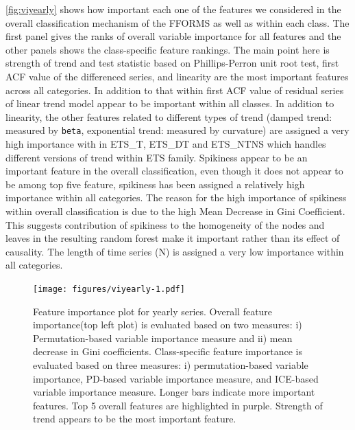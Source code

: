 \documentclass[11pt,a4paper,]{article}
\begin{document}
\autoref{fig:viyearly} shows how important each one of the features we considered in the overall classification mechanism of the FFORMS as well as within each class. The first panel gives the ranks of overall variable importance for all features and the other panels shows the class-specific feature rankings. The main point here is strength of trend and test statistic based on Phillips-Perron unit root test, first ACF value of the differenced series, and linearity are the most important features across all categories.
In addition to that within first ACF value of residual series of linear trend model appear to be important within all classes. In addition to linearity, the other features related to different types of trend (damped trend: measured by \texttt{beta}, exponential trend: measured by curvature) are assigned a very high importance with in ETS\_T, ETS\_DT and ETS\_NTNS which handles different versions of trend within ETS family. Spikiness appear to be an important feature in the overall classification, even though it does not appear to be among top five feature, spikiness has been assigned a relatively high importance within all categories. The reason for the high importance of spikiness within overall classification is due to the high Mean Decrease in Gini Coefficient. This suggests contribution of spikiness to the homogeneity of the nodes and leaves in the resulting random forest make it important rather than its effect of causality. The length of time series (N) is assigned a very low importance within all categories.

\begin{figure}
\centering
\texttt{[image: figures/viyearly-1.pdf]}
\caption{\label{fig:viyearly}Feature importance plot for yearly series. Overall feature importance(top left plot) is evaluated based on two measures: i) Permutation-based variable importance measure and ii) mean decrease in Gini coefficients. Class-specific feature importance is evaluated based on three measures: i) permutation-based variable importance, PD-based variable importance measure, and ICE-based variable importance measure. Longer bars indicate more important features. Top 5 overall features are highlighted in purple. Strength of trend appears to be the most important feature.}
\end{figure}
\end{document}
